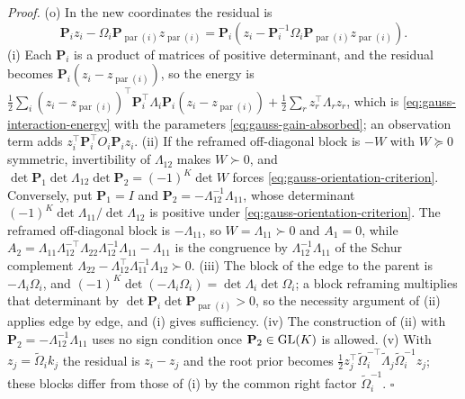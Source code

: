 \noindent\emph{Proof.}
(o) In the new coordinates the residual is
\[
\mathbf P_iz_i-\Omega_i\mathbf P_{\operatorname{par}(i)}z_{\operatorname{par}(i)}
=\mathbf P_i(z_i-\mathbf P_i^{-1}\Omega_i\mathbf P_{\operatorname{par}(i)}z_{\operatorname{par}(i)}).
\]
(i) Each \(\mathbf P_i\) is a product of matrices of positive determinant, and the
residual becomes \(\mathbf P_i(z_i-z_{\operatorname{par}(i)})\), so the energy is
\(\tfrac12\sum_i(z_i-z_{\operatorname{par}(i)})^\top \mathbf P_i^\top\Lambda_i\mathbf P_i(z_i-z_{\operatorname{par}(i)})
+\tfrac12\sum_rz_r^\top\Lambda_rz_r\), which is
\eqref{eq:gauss-interaction-energy} with the parameters
\eqref{eq:gauss-gain-absorbed}; an observation term adds
\(z_i^\top \mathbf P_i^\top O_i\mathbf P_iz_i\). (ii) If the reframed off-diagonal block is
\(-W\) with \(W\succeq0\) symmetric, invertibility of \(\Lambda_{12}\) makes
\(W\succ0\), and \(\det \mathbf P_1\det\Lambda_{12}\det \mathbf P_2=(-1)^K\det W\) forces
\eqref{eq:gauss-orientation-criterion}. Conversely, put \(\mathbf P_1=I\) and
\(\mathbf P_2=-\Lambda_{12}^{-1}\Lambda_{11}\), whose determinant
\((-1)^K\det\Lambda_{11}/\det\Lambda_{12}\) is positive under
\eqref{eq:gauss-orientation-criterion}. The reframed off-diagonal block is
\(-\Lambda_{11}\), so \(W=\Lambda_{11}\succ0\) and \(A_1=0\), while
\(A_2=\Lambda_{11}\Lambda_{12}^{-\top}\Lambda_{22}\Lambda_{12}^{-1}\Lambda_{11}-\Lambda_{11}\)
is the congruence by \(\Lambda_{12}^{-1}\Lambda_{11}\) of the Schur complement
\(\Lambda_{22}-\Lambda_{12}^\top\Lambda_{11}^{-1}\Lambda_{12}\succ0\).
(iii) The block of the edge to the parent is \(-\Lambda_i\Omega_i\), and
\((-1)^K\det(-\Lambda_i\Omega_i)=\det\Lambda_i\det\Omega_i\); a block reframing
multiplies that determinant by \(\det \mathbf P_i\det \mathbf P_{\operatorname{par}(i)}>0\), so
the necessity argument of (ii) applies edge by edge, and (i) gives sufficiency.
(iv) The construction of (ii) with \(\mathbf P_2=-\Lambda_{12}^{-1}\Lambda_{11}\) uses no
sign condition once \(\mathbf P_2\in\mathrm{GL}(K)\) is allowed. (v) With
\(z_j=\widetilde\Omega_ik_j\) the residual is \(z_i-z_j\) and the root prior
becomes \(\tfrac12z_j^\top\widetilde\Omega_i^{-\top}\widetilde\Lambda_j\widetilde\Omega_i^{-1}z_j\);
these blocks differ from those of (i) by the common right factor
\(\widetilde\Omega_i^{-1}\). \(\square\)


